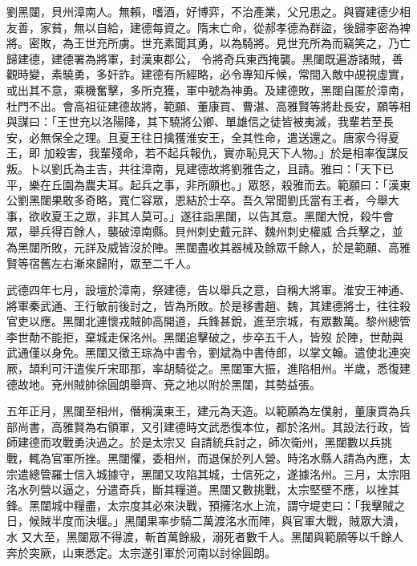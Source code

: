 \begin{pinyinscope}
 劉黑闥，貝州漳南人。無賴，嗜酒，好博弈，不治產業，父兄患之。與竇建德少相友善，家貧，無以自給，建德每資之。隋末亡命，從郝孝德為群盜，後歸李密為裨將。密敗，為王世充所虜。世充素聞其勇，以為騎將。見世充所為而竊笑之，乃亡歸建德，建德署為將軍，封漢東郡公，
 令將奇兵東西掩襲。黑闥既遍游諸賊，善觀時變，素驍勇，多奸詐。建德有所經略，必令專知斥候，常間入敵中覘視虛實，或出其不意，乘機奮擊，多所克獲，軍中號為神勇。及建德敗，黑闥自匿於漳南，杜門不出。會高祖征建德故將，範願、董康買、曹湛、高雅賢等將赴長安，願等相與謀曰：「王世充以洛陽降，其下驍將公卿、單雄信之徒皆被夷滅，我輩若至長安，必無保全之理。且夏王往日擒獲淮安王，全其性命，遣送還之。唐家今得夏王，即
 加殺害，我輩殘命，若不起兵報仇，實亦恥見天下人物。」於是相率復謀反叛。卜以劉氏為主吉，共往漳南，見建德故將劉雅告之，且請。雅曰：「天下已平，樂在丘園為農夫耳。起兵之事，非所願也。」眾怒，殺雅而去。範願曰：「漢東公劉黑闥果敢多奇略，寬仁容眾，恩結於士卒。吾久常聞劉氏當有王者，今舉大事，欲收夏王之眾，非其人莫可。」遂往詣黑闥，以告其意。黑闥大悅，殺牛會眾，舉兵得百餘人，襲破漳南縣。貝州刺史戴元詳、魏州刺史權威
 合兵擊之，並為黑闥所敗，元詳及威皆沒於陣。黑闥盡收其器械及餘眾千餘人，於是範願、高雅賢等宿舊左右漸來歸附，眾至二千人。



 武德四年七月，設壇於漳南，祭建德，告以舉兵之意，自稱大將軍。淮安王神通、將軍秦武通、王行敏前後討之，皆為所敗。於是移書趙、魏，其建德將士，往往殺官吏以應。黑闥北連懷戎賊帥高開道，兵鋒甚銳，進至宗城，有眾數萬。黎州總管李世勣不能拒，棄城走保洺州。黑闥追擊破之，步卒五千人，皆歿
 於陣，世勣與武通僅以身免。黑闥又徵王琮為中書令，劉斌為中書侍郎，以掌文翰。遣使北連突厥，頡利可汗遣俟斤宋耶那，率胡騎從之。黑闥軍大振，進陷相州。半歲，悉復建德故地。兗州賊帥徐圓朗舉齊、兗之地以附於黑闥，其勢益張。



 五年正月，黑闥至相州，僭稱漢東王，建元為天造。以範願為左僕射，董康買為兵部尚書，高雅賢為右領軍，又引建德時文武悉復本位，都於洺州。其設法行政，皆師建德而攻戰勇決過之。於是太宗又
 自請統兵討之，師次衛州，黑闥數以兵挑戰，輒為官軍所挫。黑闥懼，委相州，而退保於列人營。時洺水縣人請為內應，太宗遣總管羅士信入城據守，黑闥又攻陷其城，士信死之，遂據洺州。三月，太宗阻洺水列營以逼之，分遣奇兵，斷其糧道。黑闥又數挑戰，太宗堅壁不應，以挫其鋒。黑闥城中糧盡，太宗度其必來決戰，預擁洺水上流，謂守堤吏曰：「我擊賊之日，候賊半度而決堰。」黑闥果率步騎二萬渡洺水而陣，與官軍大戰，賊眾大潰，水
 又大至，黑闥眾不得渡，斬首萬餘級，溺死者數千人。黑闥與範願等以千餘人奔於突厥，山東悉定。太宗遂引軍於河南以討徐圓朗。




\end{pinyinscope}
